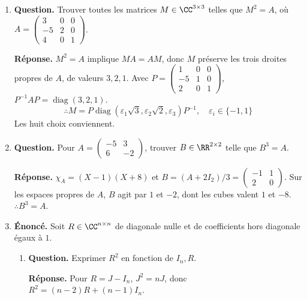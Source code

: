 \documentclass[12pt, a4paper]{article}
\begin{document}
\begin{enumerate}[label=9.\arabic*., start=94]
\begin{minipage}[t]{\linewidth}
\begin{enumerate}[\arabic*.]
\end{enumerate}
\end{minipage}

  \item \begin{minipage}[t]{\linewidth}\raggedright
\textbf{Question.} Trouver toutes les matrices $M\in\CC^{3\times3}$ telles que $M^2=A$, où $A=\begin{pmatrix}3&0&0\\-5&2&0\\4&0&1\end{pmatrix}$.
\par\smallskip
\textbf{Réponse.} $M^2=A$ implique $MA=AM$, donc $M$ préserve les trois droites propres de $A$, de valeurs $3,2,1$.
    Avec $P=\begin{pmatrix}1&0&0\\-5&1&0\\2&0&1\end{pmatrix}$, $P^{-1}AP=\operatorname{diag}(3,2,1)$.
    \[
      \therefore M=P\operatorname{diag}(\varepsilon_1\sqrt3,\varepsilon_2\sqrt2,\varepsilon_3)P^{-1},
      \quad\varepsilon_i\in\{-1,1\}
    \]
    Les huit choix conviennent.
\end{minipage}

  \item \begin{minipage}[t]{\linewidth}\raggedright
\textbf{Question.} Pour $A=\begin{pmatrix}-5&3\\6&-2\end{pmatrix}$, trouver $B\in\RR^{2\times2}$ telle que $B^3=A$.
\par\smallskip
\textbf{Réponse.} $\chi_A=(X-1)(X+8)$ et $B=(A+2I_2)/3=\begin{pmatrix}-1&1\\2&0\end{pmatrix}$.
    Sur les espaces propres de $A$, $B$ agit par $1$ et $-2$, dont les cubes valent $1$ et $-8$.
    $\therefore B^3=A$.
\end{minipage}

  \item \begin{minipage}[t]{\linewidth}\raggedright
\textbf{Énoncé.} Soit $R\in\CC^{n\times n}$ de diagonale nulle et de coefficients hors diagonale égaux à $1$.

\begin{enumerate}[\arabic*.]
        \item \textbf{Question.} Exprimer $R^2$ en fonction de $I_n,R$.
\par\smallskip
\textbf{Réponse.} Pour $R=J-I_n$, $J^2=nJ$, donc $R^2=(n-2)R+(n-1)I_n$.


\end{enumerate}
\end{minipage}
\end{enumerate}
\end{document}
